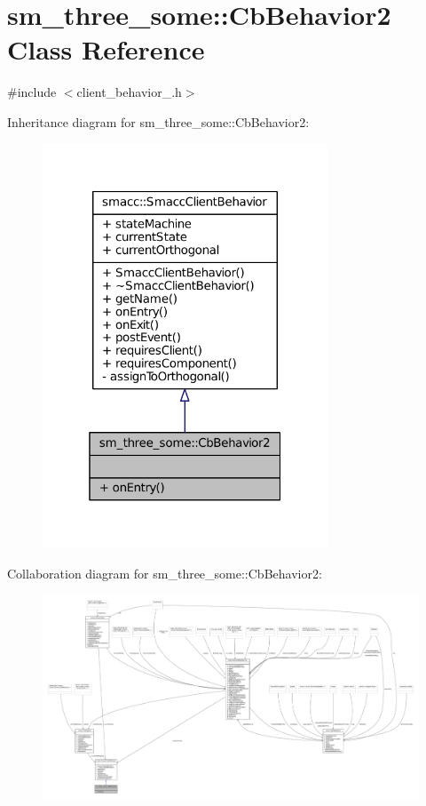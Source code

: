 \hypertarget{classsm__three__some_1_1CbBehavior2}{}\section{sm\+\_\+three\+\_\+some\+:\+:Cb\+Behavior2 Class Reference}
\label{classsm__three__some_1_1CbBehavior2}


{\ttfamily \#include $<$client\+\_\+behavior\+\_.\+h$>$}



Inheritance diagram for sm\+\_\+three\+\_\+some\+:\+:Cb\+Behavior2\+:
\nopagebreak
\begin{figure}[H]
\begin{center}
\leavevmode
\includegraphics[width=241pt]{classsm__three__some_1_1CbBehavior2__inherit__graph}
\end{center}
\end{figure}


Collaboration diagram for sm\+\_\+three\+\_\+some\+:\+:Cb\+Behavior2\+:
\nopagebreak
\begin{figure}[H]
\begin{center}
\leavevmode
\includegraphics[width=350pt]{classsm__three__some_1_1CbBehavior2__coll__graph}
\end{center}
\end{figure}
